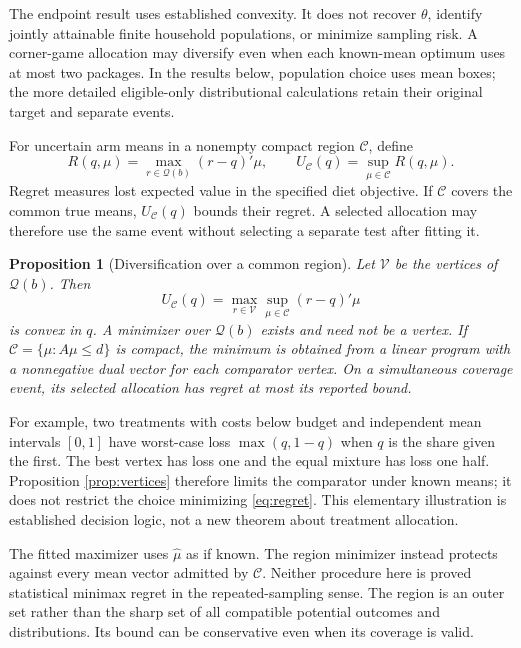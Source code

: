 \documentclass[11pt]{article}
\newtheorem{proposition}{Proposition}
\begin{document}
The endpoint result uses established convexity. It does not recover $\theta$, identify jointly attainable finite household populations, or minimize sampling risk. A corner-game allocation may diversify even when each known-mean optimum uses at most two packages. In the results below, population choice uses mean boxes; the more detailed eligible-only distributional calculations retain their original target and separate events.

For uncertain arm means in a nonempty compact region $\mathcal C$, define
\begin{equation}
 R(q,\mu)=\max_{r\in\mathcal Q(b)}(r-q)'\mu,\qquad
 U_{\mathcal C}(q)=\sup_{\mu\in\mathcal C}R(q,\mu).\label{eq:regret}
\end{equation}
Regret measures lost expected value in the specified diet objective. If $\mathcal C$ covers the common true means, $U_{\mathcal C}(q)$ bounds their regret. A selected allocation may therefore use the same event without selecting a separate test after fitting it.

\begin{proposition}[Diversification over a common region]\label{prop:allocation}
Let $\mathcal V$ be the vertices of $\mathcal Q(b)$. Then
\[
 U_{\mathcal C}(q)=\max_{r\in\mathcal V}\sup_{\mu\in\mathcal C}(r-q)'\mu
\]
is convex in $q$. A minimizer over $\mathcal Q(b)$ exists and need not be a vertex. If $\mathcal C=\{\mu:A\mu\leq d\}$ is compact, the minimum is obtained from a linear program with a nonnegative dual vector for each comparator vertex. On a simultaneous coverage event, its selected allocation has regret at most its reported bound.
\end{proposition}

For example, two treatments with costs below budget and independent mean intervals $[0,1]$ have worst-case loss $\max(q,1-q)$ when $q$ is the share given the first. The best vertex has loss one and the equal mixture has loss one half. Proposition \ref{prop:vertices} therefore limits the comparator under known means; it does not restrict the choice minimizing \eqref{eq:regret}. This elementary illustration is established decision logic, not a new theorem about treatment allocation.

The fitted maximizer uses $\widehat\mu$ as if known. The region minimizer instead protects against every mean vector admitted by $\mathcal C$. Neither procedure here is proved statistical minimax regret in the repeated-sampling sense. The region is an outer set rather than the sharp set of all compatible potential outcomes and distributions. Its bound can be conservative even when its coverage is valid.
\end{document}
